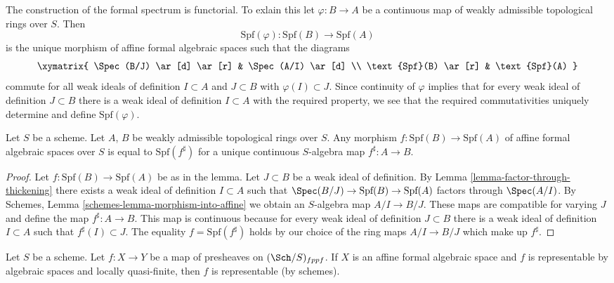 \medskip\noindent
The construction of the formal spectrum is functorial. To exlain this
let $\varphi : B \to A$ be a continuous map of weakly admissible
topological rings over $S$. Then
$$
\text{Spf}(\varphi) : \text{Spf}(B) \to \text{Spf}(A)
$$
is the unique morphism of affine formal algebraic spaces such that
the diagrams
$$
\xymatrix{
\Spec(B/J) \ar[d] \ar[r] & \Spec(A/I) \ar[d] \\
\text{Spf}(B) \ar[r] & \text{Spf}(A)
}
$$
commute for all weak ideals of definition $I \subset A$ and $J \subset B$
with $\varphi(I) \subset J$. Since continuity of $\varphi$
implies that for every weak ideal of definition $J \subset B$
there is a weak ideal of definition $I \subset A$ with the required
property, we see that the required commutativities uniquely
determine and define $\text{Spf}(\varphi)$.

\begin{lemma}
\label{lemma-morphism-between-formal-spectra}
Let $S$ be a scheme. Let $A$, $B$ be weakly admissible
topological rings over $S$. Any morphism $f : \text{Spf}(B) \to \text{Spf}(A)$
of affine formal algebraic spaces over $S$
is equal to $\text{Spf}(f^\sharp)$ for a unique continuous
$S$-algebra map $f^\sharp : A \to B$.
\end{lemma}

\begin{proof}
Let $f : \text{Spf}(B) \to \text{Spf}(A)$ be as in the lemma.
Let $J \subset B$ be a weak ideal of definition. By
Lemma \ref{lemma-factor-through-thickening}
there exists a weak ideal of definition $I \subset A$ such that
$\Spec(B/J) \to \text{Spf}(B) \to \text{Spf}(A)$
factors through $\Spec(A/I)$. By
Schemes, Lemma \ref{schemes-lemma-morphism-into-affine}
we obtain an $S$-algebra map $A/I \to B/J$.
These maps are compatible for varying $J$ and define the
map $f^\sharp : A \to B$. This map is continuous because
for every weak ideal of definition $J \subset B$ there is a
weak ideal of definition $I \subset A$ such that
$f^\sharp(I) \subset J$. The equality $f = \text{Spf}(f^\sharp)$
holds by our choice of the ring maps $A/I \to B/J$ which make up $f^\sharp$.
\end{proof}

\begin{lemma}
\label{lemma-presentation-representable}
Let $S$ be a scheme. Let $f : X \to Y$ be a map
of presheaves on $(\Sch/S)_{fppf}$. If $X$ is an affine formal algebraic
space and $f$ is representable by algebraic spaces and locally quasi-finite,
then $f$ is representable (by schemes).
\end{lemma}

